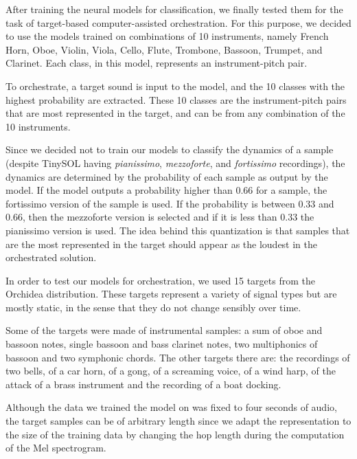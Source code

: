 \documentclass[runningheads,a4paper]{llncs}
\begin{document}
After training the neural models for classification, we finally tested them for the task of target-based computer-assisted orchestration. For this purpose, we decided to use the models trained on combinations of 10 instruments, namely French Horn, Oboe, Violin, Viola, Cello, Flute, Trombone, Bassoon, Trumpet, and Clarinet. Each class, in this model, represents an instrument-pitch pair. 

To orchestrate, a target sound is input to the model, and the 10 classes with the highest probability are extracted. These 10 classes are the instrument-pitch pairs that are most represented in the target, and can be from any combination of the 10 instruments. 

Since we decided not to train our models to classify the dynamics of a sample (despite TinySOL having \emph{pianissimo}, \emph{mezzoforte}, and \emph{fortissimo} recordings), the dynamics are determined by the probability of each sample as output by the model. If the model outputs a probability higher than $0.66$ for a sample, the fortissimo version of the sample is used. If the probability is between $0.33$ and $0.66$, then the mezzoforte version is selected and if it is less than $0.33$ the pianissimo version is used. The idea behind this quantization is that samples that are the most represented in the target should appear as the loudest in the orchestrated solution.

In order to test our models for orchestration, we used 15 targets from the Orchidea distribution. These targets represent a variety of signal types but are mostly static, in the sense that they do not change sensibly over time.

Some of the targets were made of instrumental samples: a sum of oboe and bassoon notes, single bassoon and bass clarinet notes, two multiphonics of bassoon and two symphonic chords. The other targets there are: the recordings of two bells, of a car horn, of a gong, of a screaming voice, of a wind harp, of the attack of a brass instrument and the recording of a boat docking. 

Although the data we trained the model on was fixed to four seconds of audio, the target samples can be of arbitrary length since we adapt the representation to the size of the training data by changing the hop length during the computation of the Mel spectrogram.
\end{document}
